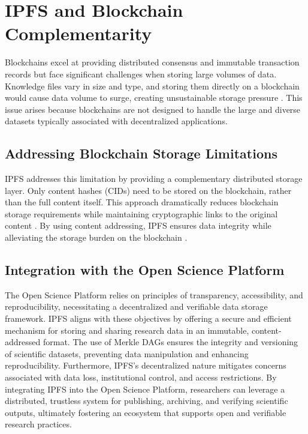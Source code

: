 \documentclass[final]{rc-book-2.14}
\begin{document}
\section{IPFS and Blockchain Complementarity}

Blockchains excel at providing distributed consensus and immutable transaction records but face significant challenges when storing large volumes of data. Knowledge files vary in size and type, and storing them directly on a blockchain would cause data volume to surge, creating unsustainable storage pressure \cite{miller2016scaling, xu2018survey}. This issue arises because blockchains are not designed to handle the large and diverse datasets typically associated with decentralized applications.


\subsection{Addressing Blockchain Storage Limitations}


IPFS addresses this limitation by providing a complementary distributed storage layer. Only content hashes (CIDs) need to be stored on the blockchain, rather than the full content itself. This approach dramatically reduces blockchain storage requirements while maintaining cryptographic links to the original content \cite{benet2014ipfs, wood2014ethereum}. By using content addressing, IPFS ensures data integrity while alleviating the storage burden on the blockchain \cite{zhang2020decentralized}.


\subsection{Integration with the Open Science Platform}

The Open Science Platform relies on principles of transparency, accessibility, and reproducibility, necessitating a decentralized and verifiable data storage framework. IPFS aligns with these objectives by offering a secure and efficient mechanism for storing and sharing research data in an immutable, content-addressed format. The use of Merkle DAGs ensures the integrity and versioning of scientific datasets, preventing data manipulation and enhancing reproducibility. Furthermore, IPFS's decentralized nature mitigates concerns associated with data loss, institutional control, and access restrictions. By integrating IPFS into the Open Science Platform, researchers can leverage a distributed, trustless system for publishing, archiving, and verifying scientific outputs, ultimately fostering an ecosystem that supports open and verifiable research practices.
\end{document}
